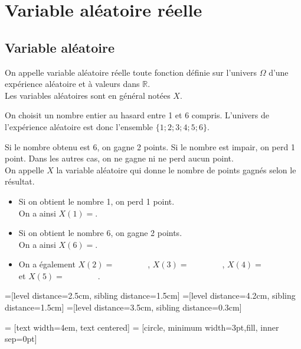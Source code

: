 \documentclass[11pt,fleqn, openany]{book} %
\begin{document}
\section{Variable aléatoire réelle}

\subsection{Variable aléatoire}

\begin{definition}On appelle variable aléatoire réelle toute fonction définie sur l'univers $\Omega$ d'une expérience aléatoire et à valeurs dans $\mathbb{R}$.\\
Les variables aléatoires sont en général notées $X$.\end{definition}

\begin{minipage}{0.55\linewidth}\begin{example}On choisit un nombre entier au hasard entre 1 et 6 compris. L'univers de l'expérience aléatoire est donc l'ensemble $\{1;2;3;4;5;6\}$.

Si le nombre obtenu est 6, on gagne 2 points. Si le nombre est impair, on perd 1 point. Dans les autres cas, on ne gagne ni ne perd aucun point.\\
On appelle $X$ la variable aléatoire qui donne le nombre de points gagnés selon le résultat.
\begin{itemize}
\item Si on obtient le nombre 1, on perd 1 point. \\On a ainsi $X(1)=$.
\item Si on obtient le nombre 6, on gagne 2 points. \\On a ainsi $X(6)=$.
\item On a également $X(2)=\qquad\qquad$, $X(3)=\qquad\qquad$, $X(4)=\qquad\qquad$ et $X(5)=\qquad\qquad$.
\end{itemize}\end{example}
\end{minipage}\hfill\begin{minipage}{0.43\linewidth}

=[level distance=2.5cm, sibling distance=1.5cm]
=[level distance=4.2cm, sibling distance=1.5cm]
=[level distance=3.5cm, sibling distance=0.3cm]

 = [text width=4em, text centered]
 = [circle, minimum width=3pt,fill, inner sep=0pt]



\end{minipage}
\end{document}
